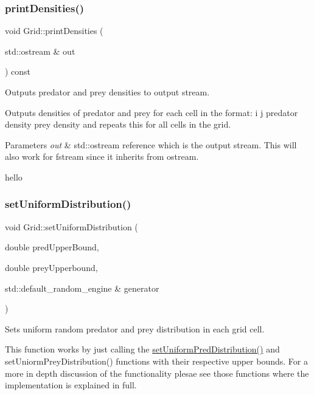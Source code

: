 \subsubsection{\texorpdfstring{print\+Densities()}{printDensities()}}
{\footnotesize\ttfamily void Grid\+::print\+Densities (\begin{DoxyParamCaption}\item[{std\+::ostream \&}]{out }\end{DoxyParamCaption}) const}



Outputs predator and prey densities to output stream. 

Outputs densities of predator and prey for each cell in the format\+: i j predator density prey density and repeats this for all cells in the grid.


\begin{DoxyParams}{Parameters}
{\em out} & std\+::ostream reference which is the output stream. This will also work for fstream since it inherits from ostream. \\
\hline
\end{DoxyParams}
hello \mbox{\label{class_grid_a17c062fcf4063a811bd8d95c32bce723}} 
\subsubsection{\texorpdfstring{set\+Uniform\+Distribution()}{setUniformDistribution()}}
{\footnotesize\ttfamily void Grid\+::set\+Uniform\+Distribution (\begin{DoxyParamCaption}\item[{double}]{pred\+Upper\+Bound,  }\item[{double}]{prey\+Upperbound,  }\item[{std\+::default\+\_\+random\+\_\+engine \&}]{generator }\end{DoxyParamCaption})}

Sets uniform random predator and prey distribution in each grid cell.

This function works by just calling the \hyperlink{class_grid_a3a67056a86378f8ce24cdf3c19ee7817}{set\+Uniform\+Pred\+Distribution()} and set\+Uniorm\+Prey\+Distribution() functions with their respective upper bounds. For a more in depth discussion of the functionality plesae see those functions where the implementation is explained in full.


